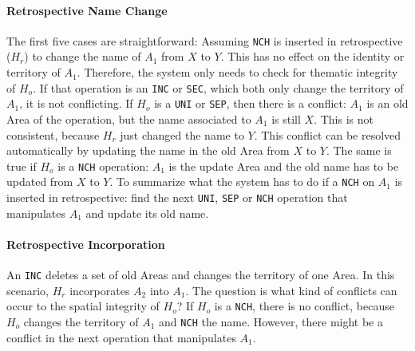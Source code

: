 
\paragraph{Retrospective Name Change} %
\label{par:retrospective_name_change}

The first five cases are straightforward: Assuming \texttt{NCH} is inserted in retrospective ($H_r$) to change the name of $A_1$ from $X$ to $Y$. This has no effect on the identity or territory of $A_1$. Therefore, the system only needs to check for thematic integrity of $H_o$. If that operation is an \texttt{INC} or \texttt{SEC}, which both only change the territory of $A_1$, it is not conflicting. If $H_o$ is a \texttt{UNI} or \texttt{SEP}, then there is a conflict: $A_1$ is an old Area of the operation, but the name associated to $A_1$ is still $X$. This is not consistent, because $H_r$ just changed the name to $Y$. This conflict can be resolved automatically by updating the name in the old Area from $X$ to $Y$. The same is true if $H_o$ is a \texttt{NCH} operation: $A_1$ is the update Area and the old name has to be updated from $X$ to $Y$. To summarize what the system has to do if a \texttt{NCH} on $A_1$ is inserted in retrospective: find the next \texttt{UNI}, \texttt{SEP} or \texttt{NCH} operation that manipulates $A_1$ and update its old name.


\paragraph{Retrospective Incorporation} %
\label{par:retrospective_incorporation}

An \texttt{INC} deletes a set of old Areas and changes the territory of one Area. In this scenario, $H_r$ incorporates $A_2$ into $A_1$. The question is what kind of conflicts can occur to the spatial integrity of $H_o$? If $H_o$ is  a \texttt{NCH}, there is no conflict, because $H_o$ changes the territory of $A_1$ and \texttt{NCH} the name. However, there might be a conflict in the next operation that manipulates $A_1$.

